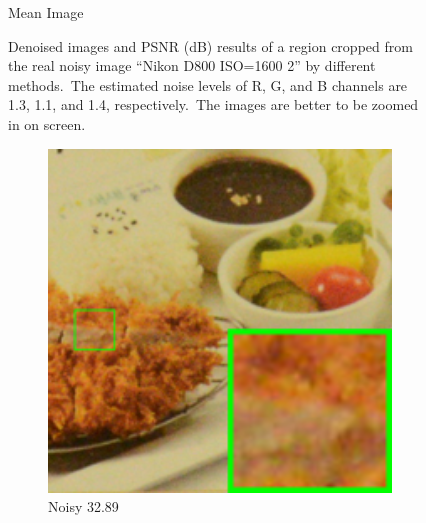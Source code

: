 \begin{figure}
{\begin{minipage}[t]{0.19\textwidth}
{\footnotesize Mean Image }
\end{minipage}
}
    \caption{Denoised images and PSNR (dB) results of a region cropped from the real noisy image ``Nikon D800 ISO=1600 2'' \cite{crosschannel2016} by different methods.\ The estimated noise levels of R, G, and B channels are 1.3, 1.1, and 1.4, respectively.\ The images are better to be zoomed in on screen.}
    \label{fig4-15}
\end{figure}

\begin{figure}
    \centering
    \begin{subfigure}[t]{0.19\textwidth}
        \centering
        \includegraphics[width=1\textwidth]{images/mcwnnm/cc/resize_br_Noisy_d800_iso3200_2.png}
		\caption{Noisy 32.89}
    \end{subfigure}
    \hfill
    \begin{subfigure}[t]{0.19\textwidth}
        \centering

\end{subfigure}
\end{figure}
